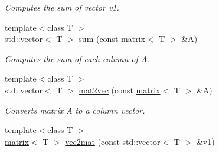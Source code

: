 \begin{DoxyCompactItemize}
\begin{DoxyCompactList}\small\item\em Computes the sum of vector v1. \end{DoxyCompactList}\item 
\hypertarget{namespacekeycpp_a778b050929a9f5cea9136df5d8bfe2d8}{{\footnotesize template$<$class T $>$ }\\std\-::vector$<$ T $>$ \hyperlink{namespacekeycpp_a778b050929a9f5cea9136df5d8bfe2d8}{sum} (const \hyperlink{classkeycpp_1_1matrix}{matrix}$<$ T $>$ \&A)}\label{namespacekeycpp_a778b050929a9f5cea9136df5d8bfe2d8}

\begin{DoxyCompactList}\small\item\em Computes the sum of each column of A. \end{DoxyCompactList}\item 
\hypertarget{namespacekeycpp_a966268670bc3e3b4f7107b8278e9b399}{{\footnotesize template$<$class T $>$ }\\std\-::vector$<$ T $>$ \hyperlink{namespacekeycpp_a966268670bc3e3b4f7107b8278e9b399}{mat2vec} (const \hyperlink{classkeycpp_1_1matrix}{matrix}$<$ T $>$ \&A)}\label{namespacekeycpp_a966268670bc3e3b4f7107b8278e9b399}

\begin{DoxyCompactList}\small\item\em Converts matrix A to a column vector. \end{DoxyCompactList}\item 
\hypertarget{namespacekeycpp_a4876140bc1dc01b4488c1bb2bba08940}{{\footnotesize template$<$class T $>$ }\\\hyperlink{classkeycpp_1_1matrix}{matrix}$<$ T $>$ \hyperlink{namespacekeycpp_a4876140bc1dc01b4488c1bb2bba08940}{vec2mat} (const std\-::vector$<$ T $>$ \&v1)}\label{namespacekeycpp_a4876140bc1dc01b4488c1bb2bba08940}


\end{DoxyCompactItemize}
